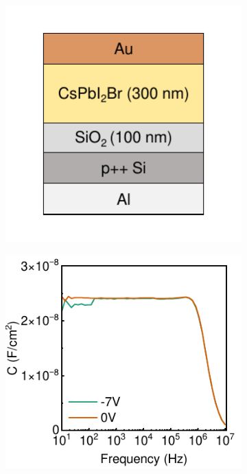 \begin{figure}[t]
\begin{subfigure}[t]{0.45\textwidth}
        \caption{}
        \label{}
    \end{subfigure}
    \caption{}
    \label{}
\end{figure}


\begin{figure}[htbp]
    \centering
    \begin{subfigure}[t]{0.42\textwidth} %
        \centering
        \includegraphics[width=\textwidth]{chapters/transport_layers/images/MOS_Structure_icon.pdf} %
        \caption{}
        \label{}
    \end{subfigure}
    \hfill %
    \begin{subfigure}[t]{0.45\textwidth} %
        \centering
        \includegraphics[width=\textwidth]{chapters/transport_layers/images/MOS_IS.pdf} %

\end{subfigure}
\end{figure}
